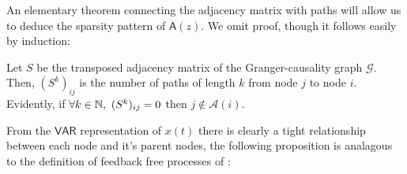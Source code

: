 \documentclass[12pt]{article}
\def\gcg{\mathcal{G}}  %
\def\VAR{\mathsf{VAR}}  %
\def\B{\mathsf{B}}  %
\def\wtB{\widetilde{\B}}  %
\def\A{\mathsf{A}}  %
\newcommand{\pa}[1]{pa(#1)}  %
\newcommand{\anc}[1]{\mathcal{A}(#1)}  %
\begin{document}
An elementary theorem connecting the adjacency matrix with paths will
allow us to deduce the sparsity pattern of $\A(z)$.  We omit proof,
though it follows easily by induction:

\begin{lemma}
  \label{lem:adj_matrix}
  Let $S$ be the transposed adjacency matrix of the Granger-causality
  graph $\gcg$.  Then, $(S^k)_{ij}$ is the number of paths of length
  $k$ from node $j$ to node $i$.  Evidently, if
  $\forall k \in \mathbb{N},\ (S^k)_{ij} = 0$ then $j \not\in \anc{i}$.
\end{lemma}


From the $\VAR$ representation of $x(t)$ there is clearly a tight
relationship between each node and it's parent nodes, the following
proposition is analagous to the definition of feedback free processes
of \cite{caines1975feedback}:



\end{document}
